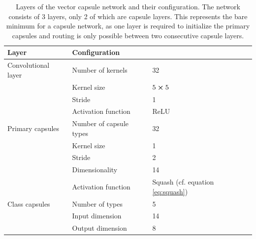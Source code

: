 \begin{table}[H]
\centering
\begin{tabular}{@{}lll@{}}
\toprule
Layer               & \multicolumn{2}{l}{Configuration}     \\ \midrule
Convolutional layer & Number of kernels       & 32          \\
                    & Kernel size             & $5\cross 5$ \\
                    & Stride                  & 1           \\
                    & Activation function     & ReLU        \\
Primary capsules    & Number of capsule types & 32          \\
                    & Kernel size             & 1           \\
                    & Stride                  & 2           \\
                    & Dimensionality          & 14          \\
                    & Activation function     & Squash (cf. equation \ref{eq:squash}) \\
Class capsules      & Number of types         & 5           \\
                    & Input dimension         & 14          \\
                    & Output dimension        & 8           \\ \bottomrule
\end{tabular}
\caption[Layers of the vector capsule network]{Layers of the vector capsule network and their configuration. The network consists of 3 layers, only 2 of which are capsule layers. This represents the bare minimum for a capsule network, as one layer is required to initialize the primary capsules and routing is only possible between two consecutive capsule layers.}
\label{tab:vector-config}
\end{table}
